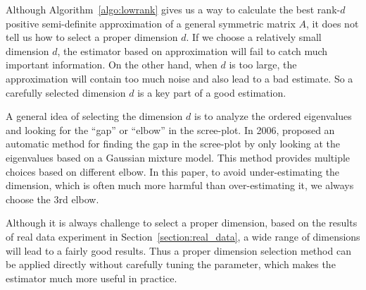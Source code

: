 \documentclass[a4paper]{article}
\begin{document}
Although Algorithm~\ref{algo:lowrank} gives us a way to calculate the best rank-$d$ positive semi-definite approximation of a general symmetric matrix $A$, it does not tell us how to select a proper dimension $d$. If we choose a relatively small dimension $d$, the estimator based on approximation will fail to catch much important information. On the other hand, when $d$ is too large, the approximation will contain too much noise and also lead to a bad estimate. So a carefully selected dimension $d$ is a key part of a good estimation.

A general idea of selecting the dimension $d$ is to analyze the ordered eigenvalues and looking for the ``gap'' or ``elbow'' in the scree-plot.
In 2006, \citet{zhu2006automatic} proposed an automatic method for finding the gap in the scree-plot by only looking at the eigenvalues based on a Gaussian mixture model. This method provides multiple choices based on different elbow. In this paper, to avoid under-estimating the dimension, which is often much more harmful than over-estimating it, we always choose the 3rd elbow.

Although it is always challenge to select a proper dimension, based on the results of real data experiment in Section~\ref{section:real_data}, a wide range of dimensions will lead to a fairly good results. Thus a proper dimension selection method can be applied directly without carefully tuning the parameter, which makes the estimator much more useful in practice.
\end{document}
